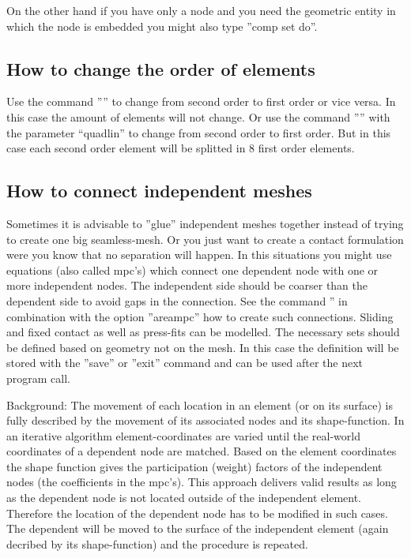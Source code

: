 \documentclass{article}
\begin{document}
\begin{appendix}
On the other hand if you have only a node and you need the geometric entity in which the node is embedded you might also type ''comp set do''.


\subsection{\label{How to change the order of elements}How to change the order of elements}
Use the command '''' to change from second order to first order or vice versa. In this case the amount of elements will not change. Or use the command '''' with the parameter ``quadlin'' to change from second order to first order. But in this case each second order element will be splitted in 8 first order elements. 


\subsection{\label{How to connect independent meshes}How to connect independent meshes}
Sometimes it is advisable to ''glue'' independent meshes together instead of trying to create one big seamless-mesh. Or you just want to create a contact formulation were you know that no separation will happen. In this situations you might use equations (also called mpc's) which connect one dependent node with one or more independent nodes. The independent side should be coarser than the dependent side to avoid gaps in the connection. See the command '' in combination with the option ''areampc'' how to create such connections. Sliding and fixed contact as well as press-fits can be modelled. The necessary sets should be defined based on geometry not on the mesh. In this case the definition will be stored with the ''save'' or ''exit'' command and can be used after the next program call.

Background: The movement of each location in an element (or on its surface) is fully described by the movement of its associated nodes and its shape-function. In an iterative algorithm element-coordinates are varied until the real-world coordinates of a dependent node are matched. Based on the element coordinates the shape function gives the participation (weight) factors of the independent nodes (the coefficients in the mpc's). This approach delivers valid results as long as the dependent node is not located outside of the independent element. Therefore the location of the dependent node has to be modified in such cases. The dependent will be moved to the surface of the independent element (again decribed by its shape-function) and the procedure is repeated.


\end{appendix}
\end{document}
